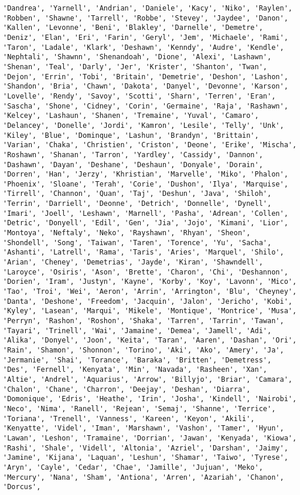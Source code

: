 \documentclass[11pt]{article}
\begin{document}
\begin{Verbatim}[commandchars=\\\{\}]
'Dandrea', 'Yarnell', 'Andrian', 'Daniele', 'Kacy', 'Niko', 'Raylen', 'Robben', 'Shawne', 'Tarrell', 'Robbe', 'Stevey', 'Jaydee', 'Danon', 'Kallen', 'Levonne', 'Beni', 'Blakley', 'Darnelle', 'Demetre', 'Deniz', 'Elan', 'Eri', 'Farin', 'Geryl', 'Jem', 'Michaele', 'Rami', 'Taron', 'Ladale', 'Klark', 'Deshawn', 'Kenndy', 'Audre', 'Kendle', 'Nephtali', 'Shawnn', 'Shenandoah', 'Dione', 'Alexi', 'Lashawn', 'Shenan', 'Teal', 'Darly', 'Jer', 'Krister', 'Shanton', 'Twan', 'Dejon', 'Errin', 'Tobi', 'Britain', 'Demetrie', 'Deshon', 'Lashon', 'Shandon', 'Bria', 'Chawn', 'Dakota', 'Danyel', 'Devonne', 'Karson', 'Lovelle', 'Rendy', 'Savoy', 'Scotti', 'Sharn', 'Terren', 'Eran', 'Sascha', 'Shone', 'Cidney', 'Corin', 'Germaine', 'Raja', 'Rashawn', 'Kelcey', 'Lashaun', 'Shanen', 'Tremaine', 'Yuval', 'Camaro', 'Delancey', 'Donelle', 'Jordi', 'Kamron', 'Lesile', 'Telly', 'Unk', 'Kiley', 'Blue', 'Dominque', 'Lashun', 'Brandyn', 'Brittain', 'Varian', 'Chaka', 'Christien', 'Criston', 'Deone', 'Erike', 'Mischa', 'Roshawn', 'Shanan', 'Tarron', 'Yardley', 'Cassidy', 'Dannon', 'Dashawn', 'Dayan', 'Deshane', 'Deshaun', 'Donyale', 'Dorain', 'Dorren', 'Han', 'Jerzy', 'Khristian', 'Marvelle', 'Miko', 'Phalon', 'Phoenix', 'Sloane', 'Terah', 'Corie', 'Dushon', 'Ilya', 'Marquise', 'Tirrell', 'Channon', 'Quan', 'Taj', 'Deshun', 'Java', 'Shiloh', 'Terrin', 'Darriell', 'Deonne', 'Detrich', 'Donnelle', 'Dynell', 'Imari', 'Joell', 'Leshawn', 'Marnell', 'Pasha', 'Adrean', 'Collen', 'Detric', 'Donyell', 'Edil', 'Gen', 'Jia', 'Jojo', 'Kimani', 'Lior', 'Montoya', 'Neftaly', 'Neko', 'Rayshawn', 'Rhyan', 'Sheon', 'Shondell', 'Song', 'Taiwan', 'Taren', 'Torence', 'Yu', 'Sacha', 'Ashanti', 'Latrell', 'Rama', 'Taris', 'Aries', 'Marquel', 'Shilo', 'Arian', 'Cheney', 'Demetrias', 'Jayde', 'Kiran', 'Shawndell', 'Laroyce', 'Osiris', 'Ason', 'Brette', 'Charon', 'Chi', 'Deshannon', 'Dorien', 'Iram', 'Justyn', 'Kayne', 'Korby', 'Koy', 'Lavonn', 'Mico', 'Tao', 'Troi', 'Wei', 'Aeron', 'Arrin', 'Arrington', 'Blu', 'Cheyney', 'Danta', 'Deshone', 'Freedom', 'Jacquin', 'Jalon', 'Jericho', 'Kobi', 'Kyley', 'Lasean', 'Marqui', 'Mikele', 'Montique', 'Montrice', 'Musa', 'Perryn', 'Rashon', 'Roshon', 'Shaka', 'Tarren', 'Tarrin', 'Tawan', 'Tayari', 'Trinell', 'Wai', 'Jamaine', 'Demea', 'Jamell', 'Adi', 'Alika', 'Donyel', 'Joon', 'Keita', 'Taran', 'Aaren', 'Dashan', 'Ori', 'Rain', 'Shamon', 'Shonnon', 'Torino', 'Aki', 'Ako', 'Amery', 'Ja', 'Jermanie', 'Shai', 'Torance', 'Baraka', 'Britten', 'Demetress', 'Des', 'Fernell', 'Kenyata', 'Min', 'Navada', 'Rasheen', 'Xan', 'Altie', 'Andrel', 'Aquarius', 'Arrow', 'Billyjo', 'Briar', 'Camara', 'Chalon', 'Chane', 'Charron', 'Deejay', 'Deshan', 'Diarra', 'Domonique', 'Edris', 'Heathe', 'Irin', 'Josha', 'Kindell', 'Nairobi', 'Neco', 'Nima', 'Ranell', 'Rejean', 'Semaj', 'Shanne', 'Terrice', 'Toriana', 'Trenell', 'Vanness', 'Kareen', 'Keyon', 'Akili', 'Kenyatte', 'Videl', 'Iman', 'Marshawn', 'Vashon', 'Tamer', 'Hyun', 'Lawan', 'Leshon', 'Tramaine', 'Dorrian', 'Jawan', 'Kenyada', 'Kiowa', 'Rashi', 'Shale', 'Videll', 'Altonia', 'Azriel', 'Darshan', 'Jaimy', 'Jamine', 'Kijana', 'Laquan', 'Leshun', 'Shamar', 'Taiwo', 'Tyrese', 'Aryn', 'Cayle', 'Cedar', 'Chae', 'Jamille', 'Jujuan', 'Meko', 'Mercury', 'Nana', 'Sham', 'Antiona', 'Arren', 'Azariah', 'Chanon', 'Dorcus', 
\end{Verbatim}
\end{document}

